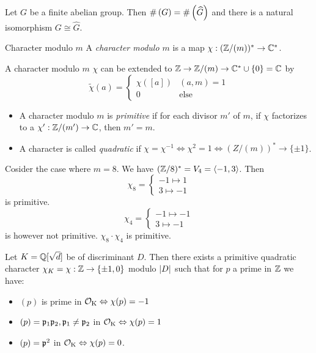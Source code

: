 \documentclass[12pt, a4paper]{article}
\begin{document}
	\begin{rem}
		Let $G$ be a finite abelian group. Then $\operatorname{\#}\left(G \right) = \operatorname{\#}\left(\widehat G \right)$ and there is a natural 
		isomorphism $G \cong \widehat G$.
	\end{rem}

	\begin{Def}{Character modulo $m$}{}
		A \emph{character modulo $m$} is a map $\chi: (\mathbb{Z} / (m))^* \to \mathbb{C}^*$.
	\end{Def}

	\begin{rem}
		A character modulo $m$ $\chi$ can be extended to $\mathbb{Z} \to \mathbb{Z} / (m) \to \mathbb{C}^* \cup \{0\} = \mathbb{C}$
		by 
		$$\tilde\chi(a) = \begin{cases}
			\chi([a]) & (a, m) = 1 \\
			0 & \text{else}
		\end{cases}$$
	\end{rem}

	\begin{Def}{}{}
		\begin{itemize}
		\item 
		A character modulo $m$ is \emph{primitive} if for each divisor $m'$ of $m$, if 
		$\chi$ factorizes to a $\chi': \mathbb{Z} / (m') \to \mathbb{C}$, then $m' = m$.
		\item 
		A character is called \emph{quadratic} if $\chi = \chi^{-1} \iff \chi^2 = 1 
		\iff (Z/(m))^* \to \{\pm 1\} $. 
		\end{itemize}
	\end{Def}

	\begin{ex}
		Cosider the case where $m = 8$.	We have $(\mathbb{Z} / 8)^* = V_4 = \langle -1, 3 \rangle$. Then 
		$$\chi_8 = \begin{cases} -1 \mapsto 1 \\ 
							3 \mapsto -1
				   \end{cases}$$
		is primitive.
		$$\chi_4 = \begin{cases} -1 \mapsto -1 \\ 
							3 \mapsto -1
				   \end{cases}$$
		is however not primitive.
		$\chi_8 \cdot \chi_4$ is primitive.
	\end{ex}

	\begin{thm}{}{}
		Let $K = \mathbb{Q}[\sqrt{d}]$ be of discriminant $D$. Then there exists a primitive quadratic 
		character $\chi_K = \chi : \mathbb{Z} \to \{\pm 1, 0\} $ modulo $\lvert D \rvert$ such that 
		for $p$ a prime in $\mathbb{Z}$ we have: 
		\begin{itemize}
			\item $(p)$ is prime in $\operatorname{\mathcal{O}_K} \Leftrightarrow \chi(p) = -1$
			\item $(p) = \mathfrak{p}_1 \mathfrak{p}_2, \mathfrak{p}_1 \neq \mathfrak{p}_2$ in $\operatorname{\mathcal{O}_K} \Leftrightarrow \chi(p) = 1$
			\item $(p) = \mathfrak{p}^2$ in $\operatorname{\mathcal{O}_K} \Leftrightarrow \chi(p) = 0$.
		\end{itemize}
	\end{thm}

	
\end{document}
